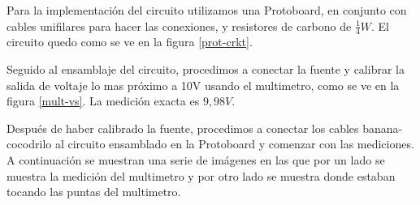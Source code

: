 \documentclass[a4paper,12pt, spanish]{report}
\begin{document}
      Para la implementación del circuito utilizamos una Protoboard, en conjunto con cables unifilares para hacer 
      las conexiones, y resistores de carbono de $\tfrac{1}{4}W$. El circuito quedo como se ve en la figura 
      \ref{prot-crkt}.

      Seguido al ensamblaje del circuito, procedimos a conectar la fuente y calibrar la salida de voltaje lo mas
      próximo a 10V usando el multimetro, como se ve en la figura \ref{mult-vs}. La medición exacta es $9,98V$.

      Después de haber calibrado la fuente, procedimos a conectar los cables banana-cocodrilo al circuito ensamblado
      en la Protoboard y comenzar con las mediciones. A continuación se muestran una serie de imágenes en las que por
      un lado se muestra la medición del multimetro y por otro lado se muestra donde estaban tocando las puntas del
      multimetro.
\end{document}
